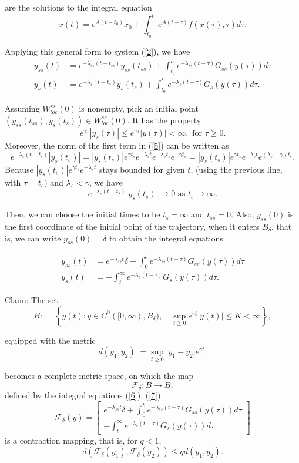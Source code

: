 \documentclass[a4paper,11pt,pdftex]{article}
\newcommand{\W}{W^{ss}_{loc}(0)}
\begin{document}
are the solutions to the integral equation
$$
x(t) = e^{A(t-t_0)}x_0 + \int_{t_0}^t e^{A(t-\tau)}f(x(\tau),\tau)d\tau.
$$

Applying this general form to system (\ref{2}), we have
\begin{align}
y_{ss}(t) &= e^{-\lambda_{ss}(t-t_{ss})}y_{ss}(t_{ss}) + \int_{t_0}^t e^{-\lambda_{ss}(t-\tau)}G_{ss}(y(\tau))d\tau \\
\label{5}
y_s(t) &= e^{-\lambda_s(t-t_s)}y_s(t_s) + \int_{t_0}^t e^{-\lambda_s(t-\tau)}G_s(y(\tau))d\tau. 
\end{align}

Assuming $\W$ is nonempty, pick an initial point $(y_{ss}(t_{ss}), y_s(t_s))\in \W$. It has the property 
$$
e^{\gamma \tau}|y_s(\tau)| \leq e^{\gamma \tau}|y(\tau)| < \infty, \text{ for } \tau \geq 0.
$$
Moreover, the norm of the first term in (\ref{5}) can be written as
$$
e^{-\lambda_s(t-t_s)}|y_s(t_s)| = |y_s(t_s)|e^{\gamma t_s} e^{-\lambda_s t}e^{-\lambda_s t_s}e^{-\gamma t_s} = |y_s(t_s)|e^{\gamma t_s} e^{-\lambda_s t} e^{(\lambda_s - \gamma)t_s}.
$$
Because $|y_s(t_s)|e^{\gamma t_s} e^{-\lambda_s t}$ stays bounded for given $t$, (using the previous line, with $\tau = t_s$) and $\lambda_s<\gamma$, we have 
$$
e^{-\lambda_s(t-t_s)}|y_s(t_s)| \to 0 \text{ as } t_s \to \infty.
$$

Then, we can choose the initial times to be $t_s = \infty$ and $t_{ss}=0$. Also, $y_{ss}(0)$ is the first coordinate of the initial point of the trajectory, when it enters $B_\delta$, that is, we can write $y_{ss}(0)=\delta$ to obtain the integral equations

\begin{align}
\label{6}
y_{ss}(t) &= e^{-\lambda_{ss}t}\delta + \int_{0}^t e^{-\lambda_{ss}(t-\tau)}G_{ss}(y(\tau))d\tau \\
\label{7}
y_s(t) &= - \int_{t}^\infty e^{-\lambda_s(t-\tau)}G_s(y(\tau))d\tau. 
\end{align}

Claim: The set 
$$
B : = \left \{ y(t): y\in C^0 ([0, \infty), B_\delta ), \quad  \sup_{t\geq 0} e^{\gamma t}|y(t)|\leq K <\infty \right \},
$$

equipped with the metric 
$$
d(y_1, y_2) := \sup_{t\geq 0} |y_1 - y_2|e^{\gamma t}. 
$$

becomes a complete metric space, on which the map
$$
\mathcal{F}_\delta  : B \to B,
$$
defined by the integral equations (\ref{6}), (\ref{7})
$$
\mathcal{F}_\delta (y) = \begin{bmatrix} e^{-\lambda_{ss}t}\delta + \int_{0}^t e^{-\lambda_{ss}(t-\tau)}G_{ss}(y(\tau))d\tau \\
- \int_{t}^\infty e^{-\lambda_s(t-\tau)}G_s(y(\tau))d\tau
\end{bmatrix}
$$
is a contraction mapping, that is, for $q<1$, 
$$
d(\mathcal{F}_\delta(y_1), \mathcal{F}_\delta(y_2))\leq q d(y_1, y_2). 
$$
\end{document}
